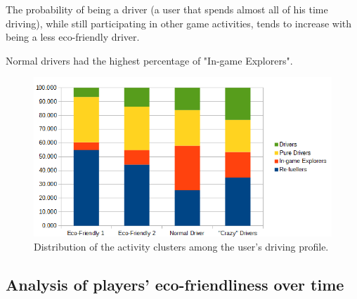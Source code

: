 \documentclass[preprint,authoryear,12pt]{elsarticle}
\begin{document}
The probability of being a driver (a user that spends almost all of his time driving), while still participating in other game activities, tends to increase with being a less eco-friendly driver.

Normal drivers had the highest percentage of "In-game Explorers".



\begin{figure}[htb]
	\begin{center}
		\includegraphics[width=.8\linewidth]{ijhcs14-img/cluster_activities_driver_types}
		\caption{Distribution of the activity clusters among the user's driving profile.\label{fig:activity_driving}}
	\end{center}
\end{figure}



\subsection{Analysis of players' eco-friendliness over time }
\label{subsec:eco-friendliness_over_time}
\end{document}
